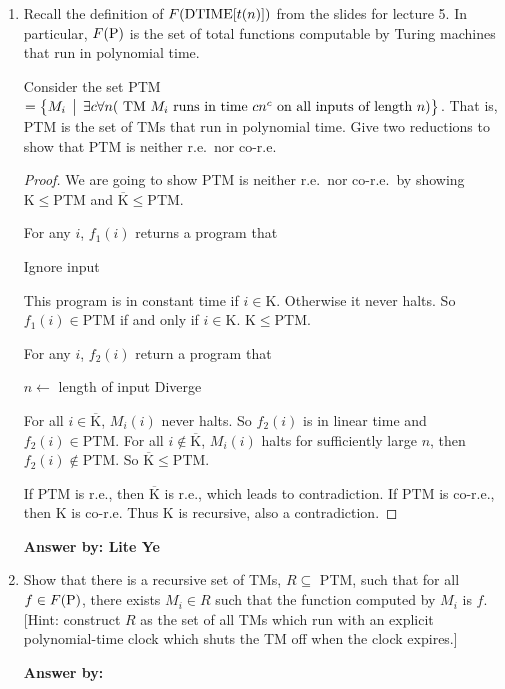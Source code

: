 \documentclass[12pt]{article}
\begin{document}
\noindent{}
\addtocounter{section}{1}

\begin{enumerate}
  \item Recall the definition of $F(\mbox{{\rm DTIME}}[t(n)])$ from the slides for lecture 5.  In particular,
  $F(\mbox{{\rm P}})$ is the set of total functions computable by Turing machines that run in polynomial time.  

Consider the set PTM  
$=\bigl\{ M_i \,\bigm|\, \exists c \forall n(\mbox{ TM $M_i$ runs in time $cn^c$ on all inputs of length $n$}
  ) \bigr\}$. 
That is, PTM is the set of TMs that run in polynomial time.
Give two reductions to show that PTM is neither r.e.\ nor co-r.e.

\begin{proof}
  We are going to show PTM is neither r.e.\ nor co-r.e.\ by showing
  $\mathrm{K}\leq \mathrm{PTM}$ and $\overline{\mathrm{K}}\leq \mathrm{PTM}$.
  
  For any $i$, $f_1(i)$ returns a program that
  \begin{center}
    \begin{algorithmic}
      \STATE Ignore input   \ELSE {}
      \ENDIF
    \end{algorithmic}
  \end{center}
  This program is in constant time if $i\in \mathrm{K}$. Otherwise it never halts. So $f_1(i)\in
  \mathrm{PTM}$ if and only if $i \in \mathrm{K}$. $\mathrm{K}\leq \mathrm{PTM}$.
  
  For any $i$, $f_2(i)$ return a program that
  \begin{center}
    \begin{algorithmic}
      \STATE $n \gets$ length of input
      \STATE Diverge
      \ELSE
      \ENDIF
    \end{algorithmic}
  \end{center}
  For all $i\in \overline{\mathrm{K}}$, $M_i(i)$ never halts. So $f_2(i)$ is in
  linear time and $f_2(i) \in \mathrm{PTM}$. For all $i\not\in
  \overline{\mathrm{K}}$, $M_i(i)$ halts for sufficiently large $n$, then
  $f_2(i)\not\in \mathrm{PTM}$. So $\overline{\mathrm{K}}\leq \mathrm{PTM}$.

  If $\mathrm{PTM}$ is r.e., then $\overline{\mathrm{K}}$ is r.e., which leads
  to contradiction. If $\mathrm{PTM}$ is co-r.e., then $\mathrm{K}$ is co-r.e.
  Thus $\mathrm{K}$ is recursive, also a contradiction.
\end{proof}

{\bf Answer by: Lite Ye} 

\item Show that there is a recursive set of TMs, $R \subseteq$ PTM, such that for all $f \in F(\mbox{{\rm P}})$,
  there exists $M_i \in R$ such that the function computed by $M_i$ is $f$.  [Hint:  construct $R$
    as the set of all TMs which run with an explicit polynomial-time clock which shuts the TM off
    when the clock expires.]

{\bf Answer by:} 

\end{enumerate}
\end{document}
